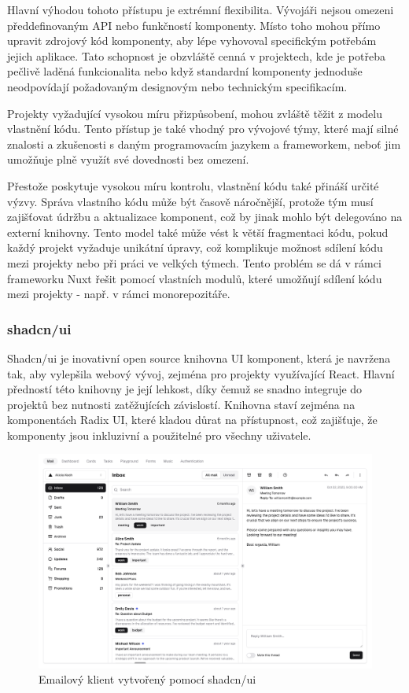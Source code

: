 Hlavní výhodou tohoto přístupu je extrémní flexibilita. Vývojáři nejsou omezeni předdefinovaným API nebo funkčností komponenty. Místo toho mohou přímo upravit zdrojový kód komponenty, aby lépe vyhovoval specifickým potřebám jejich aplikace. Tato schopnost je obzvláště cenná v projektech, kde je potřeba pečlivě laděná funkcionalita nebo když standardní komponenty jednoduše neodpovídají požadovaným designovým nebo technickým specifikacím.

Projekty vyžadující vysokou míru přizpůsobení, mohou zvláště těžit z modelu vlastnění kódu. Tento přístup je také vhodný pro vývojové týmy, které mají silné znalosti a zkušenosti s daným programovacím jazykem a frameworkem, neboť jim umožňuje plně využít své dovednosti bez omezení.

Přestože poskytuje vysokou míru kontrolu, vlastnění kódu také přináší určité výzvy. Správa vlastního kódu může být časově náročnější, protože tým musí zajišťovat údržbu a aktualizace komponent, což by jinak mohlo být delegováno na externí knihovny. Tento model také může vést k větší fragmentaci kódu, pokud každý projekt vyžaduje unikátní úpravy, což komplikuje možnost sdílení kódu mezi projekty nebo při práci ve velkých týmech. Tento problém se dá v rámci frameworku Nuxt řešit pomocí vlastních modulů, které umožňují sdílení kódu mezi projekty - např. v rámci monorepozitáře.

\subsubsection{shadcn/ui}
Shadcn/ui je inovativní open source knihovna UI komponent, která je navržena tak, aby vylepšila webový vývoj, zejména pro projekty využívající React.
Hlavní předností této knihovny je její lehkost, díky čemuž se snadno integruje do projektů bez nutnosti zatěžujících závislostí. Knihovna staví
zejména na komponentách Radix UI, které kladou důrat na přístupnost, což zajišťuje, že komponenty jsou inkluzivní a použitelné pro všechny uživatele. \cite{ShadcnUI}

\begin{figure}[H]
    \includegraphics[width=\textwidth]{images/shadcn}
    \caption{Emailový klient vytvořený pomocí shadcn/ui} \label{picture:shadcn}
\end{figure}

